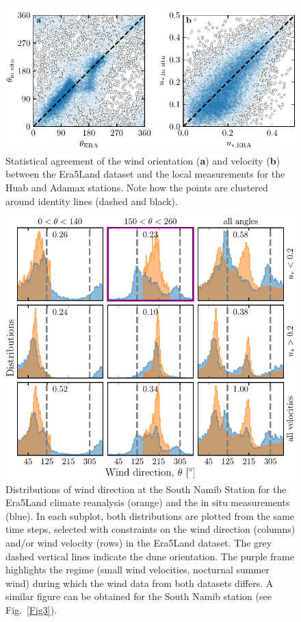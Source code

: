 \begin{figure}
  \centering
  \includegraphics[scale=1]{Figures/Figure5_supp.pdf}
  \caption{Statistical agreement of the wind orientation (\textbf{a}) and velocity (\textbf{b}) between the Era5Land dataset and the local measurements for the Huab and Adamax stations. Note how the points are clustered around identity lines (dashed and black).}
  \label{Fig5_supp}
\end{figure}

\begin{figure}
  \centering
  \includegraphics[scale=1]{Figures/Figure6_supp.pdf}
  \caption{Distributions of wind direction at the South Namib Station for the Era5Land climate reanalysis (orange) and the in situ measurements (blue). In each subplot, both distributions are plotted from the same time steps, selected with constraints on the wind direction (columns) and/or wind velocity (rows) in the Era5Land dataset. The grey dashed vertical lines indicate the dune orientation. The purple frame highlights the regime (small wind velocities, nocturnal summer wind) during which the wind data from both datasets differs. A similar figure can be obtained for the South Namib station (see Fig.~\ref{Fig3}).}
  \label{Fig6_supp}
\end{figure}


